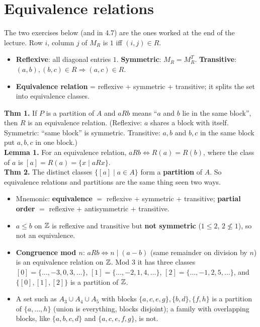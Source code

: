 \documentclass{fkt-notes}
\newcommand{\src}[1]{\par\noindent{\small\itshape Source: #1}\par\smallskip}
\newcommand{\kolman}[1]{\setcounter{section}{\numexpr#1-1\relax}}
\theoremstyle{definition}
\begin{document}
\kolman{5}
\section{Equivalence relations}\src{Kolman 4.5}\label{qg:equiv}
%

The two exercises below (and in 4.7) are the ones worked at the end of
the lecture. Row $i$, column $j$ of $M_R$ is
$1$ iff $(i,j)\in R$.
\begin{itemize}
  \item \textbf{Reflexive}: all diagonal entries $1$.
        \textbf{Symmetric}: $M_R=M_R^T$.
        \textbf{Transitive}: $(a,b),(b,c)\in R\Rightarrow(a,c)\in R$.
  \item \textbf{Equivalence relation} = reflexive + symmetric + transitive;
        it splits the set into equivalence classes.
\end{itemize}

\begin{rulebox}[title={4.5 Theorems 1, 2 and Lemma 1}]
  \textbf{Thm 1.} If $P$ is a partition of $A$ and $aRb$ means ``$a$ and $b$
  lie in the same block'', then $R$ is an equivalence relation.
  (Reflexive: $a$ shares a block with itself. Symmetric: ``same block'' is
  symmetric. Transitive: $a,b$ and $b,c$ in the same block put $a,b,c$ in one
  block.)\\
  \textbf{Lemma 1.} For an equivalence relation, $aRb\iff R(a)=R(b)$, where
  the class of $a$ is $[a]=R(a)=\{x\mid aRx\}$.\\
  \textbf{Thm 2.} The distinct classes $\{[a]\mid a\in A\}$ form a
  \textbf{partition} of $A$. So equivalence relations and partitions are the
  same thing seen two ways.
\end{rulebox}
\begin{itemize}[nosep]
  \item Mnemonic: \textbf{equivalence} $=$ reflexive $+$ symmetric $+$
        transitive; \textbf{partial order} $=$ reflexive $+$ antisymmetric $+$
        transitive.
  \item $a\le b$ on $\mathbb{Z}$ is reflexive and transitive but \textbf{not
          symmetric} ($1\le2$, $2\not\le1$), so not an equivalence.
  \item \textbf{Congruence mod $n$}: $aRb\iff n\mid(a-b)$ (same remainder
        on division by $n$) is an equivalence relation on $\mathbb{Z}$. Mod $3$ it
        has three classes
        $[0]=\{\dots,-3,0,3,\dots\}$, $[1]=\{\dots,-2,1,4,\dots\}$,
        $[2]=\{\dots,-1,2,5,\dots\}$, and $\{[0],[1],[2]\}$ is a partition
        of $\mathbb{Z}$.
  \item A set such as $A_3\cup A_4\cup A_5$ with blocks
        $\{a,c,e,g\},\{b,d\},\{f,h\}$ is a partition of
        $\{a,\dots,h\}$ (union is everything, blocks disjoint); a family
        with overlapping blocks, like $\{a,b,c,d\}$ and $\{a,c,e,f,g\}$, is
        not.
\end{itemize}
\end{document}
